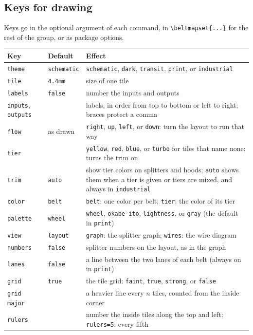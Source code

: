 \documentclass[11pt]{article}
\newcommand\key[1]{\texttt{#1}}
\begin{document}
	\subsection{Keys for drawing}

	Keys go in the optional argument of each command, in \verb|\beltmapset{...}| for the rest of the group, or as package options.

	\begin{tabularx}{\linewidth}{@{}l l X@{}}
		\toprule
		Key & Default & Effect \\
		\midrule
		\key{theme} & \key{schematic} & \key{schematic}, \key{dark}, \key{transit}, \key{print}, or \key{industrial} \\
		\key{tile} & \key{4.4mm} & size of one tile \\
		\key{labels} & \key{false} & number the inputs and outputs \\
		\key{inputs}, \key{outputs} & & labels, in order from top to bottom or left to right; braces protect a comma \\
		\key{flow} & as drawn & \key{right}, \key{up}, \key{left}, or \key{down}: turn the layout to run that way \\
		\key{tier} & & \key{yellow}, \key{red}, \key{blue}, or \key{turbo} for tiles that name none; turns the trim on \\
		\key{trim} & \key{auto} & show tier colors on splitters and hoods; \key{auto} shows them when a tier is given or tiers are mixed, and always in \key{industrial} \\
		\key{color} & \key{belt} & \key{belt}: one color per belt; \key{tier}: the color of its tier \\
		\key{palette} & \key{wheel} & \key{wheel}, \key{okabe-ito}, \key{lightness}, or \key{gray} (the default in \key{print}) \\
		\key{view} & \key{layout} & \key{graph}: the splitter graph; \key{wires}: the wire diagram \\
		\key{numbers} & \key{false} & splitter numbers on the layout, as in the graph \\
		\key{lanes} & \key{false} & a line between the two lanes of each belt (always on in \key{print}) \\
		\key{grid} & \key{true} & the tile grid: \key{faint}, \key{true}, \key{strong}, or \key{false} \\
		\key{grid major} & & a heavier line every $n$ tiles, counted from the inside corner \\
		\key{rulers} & & number the inside tiles along the top and left; \key{rulers=5}: every fifth \\

\end{tabularx}
\end{document}
